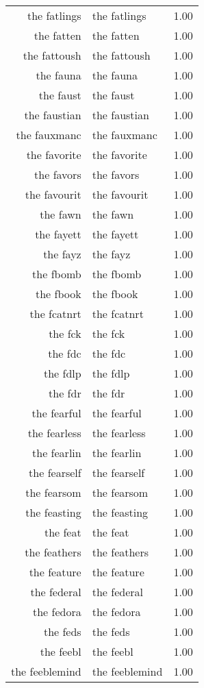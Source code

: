 \begin{table}[ht]
\begin{tabular}{rlr}
  the fatlings & the fatlings & 1.00 \\ 
  the fatten & the fatten & 1.00 \\ 
  the fattoush & the fattoush & 1.00 \\ 
  the fauna & the fauna & 1.00 \\ 
  the faust & the faust & 1.00 \\ 
  the faustian & the faustian & 1.00 \\ 
  the fauxmanc & the fauxmanc & 1.00 \\ 
  the favorite & the favorite & 1.00 \\ 
  the favors & the favors & 1.00 \\ 
  the favourit & the favourit & 1.00 \\ 
  the fawn & the fawn & 1.00 \\ 
  the fayett & the fayett & 1.00 \\ 
  the fayz & the fayz & 1.00 \\ 
  the fbomb & the fbomb & 1.00 \\ 
  the fbook & the fbook & 1.00 \\ 
  the fcatnrt & the fcatnrt & 1.00 \\ 
  the fck & the fck & 1.00 \\ 
  the fdc & the fdc & 1.00 \\ 
  the fdlp & the fdlp & 1.00 \\ 
  the fdr & the fdr & 1.00 \\ 
  the fearful & the fearful & 1.00 \\ 
  the fearless & the fearless & 1.00 \\ 
  the fearlin & the fearlin & 1.00 \\ 
  the fearself & the fearself & 1.00 \\ 
  the fearsom & the fearsom & 1.00 \\ 
  the feasting & the feasting & 1.00 \\ 
  the feat & the feat & 1.00 \\ 
  the feathers & the feathers & 1.00 \\ 
  the feature & the feature & 1.00 \\ 
  the federal & the federal & 1.00 \\ 
  the fedora & the fedora & 1.00 \\ 
  the feds & the feds & 1.00 \\ 
  the feebl & the feebl & 1.00 \\ 
  the feeblemind & the feeblemind & 1.00 \\ 

\end{tabular}
\end{table}

